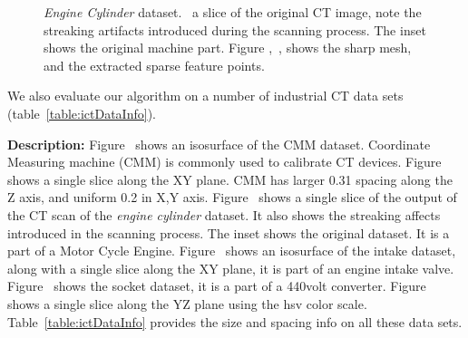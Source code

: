 \begin{figure}[htb]
    \centering
    \caption{\textit{Engine Cylinder} dataset.~\protect{} a slice of the original CT image, note the streaking artifacts introduced during the scanning process.
    The inset shows the original machine part. Figure \protect{},~\protect{}, shows the sharp mesh, and the extracted sparse feature points.}
    \label{fig:setA.crop1}
\end{figure}
We also evaluate our algorithm on a number of industrial CT data sets (table~\ref{table:ictDataInfo}). 

\textbf{Description:} Figure~ shows an isosurface of the CMM dataset. Coordinate Measuring machine (CMM) is commonly used to calibrate CT devices. Figure~ shows a single slice along the XY plane. CMM has larger 0.31 spacing along the Z axis, and uniform 0.2 in X,Y axis.
Figure~ shows a single slice of the output of the CT scan of the \textit{engine cylinder} dataset. It also shows the streaking affects introduced in the scanning process. The inset shows the original dataset. It is a part of a Motor Cycle Engine.
Figure~ shows an isosurface of the intake dataset, along with a single slice along the XY plane, it is part of an engine intake valve. Figure~ shows the socket dataset, it is a part of a 440volt converter. Figure~ shows a single slice along the YZ plane using the hsv color scale. Table~\ref{table:ictDataInfo} provides the size and spacing info on all these data sets. 

